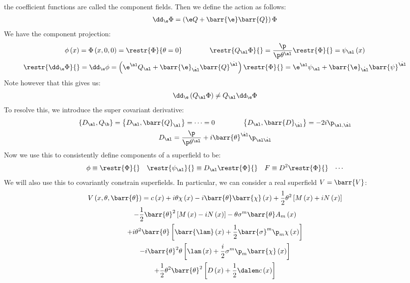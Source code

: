 \documentclass{booc}
\begin{document}
the coefficient functions are called the component fields.
Then we define the action as follows:
\begin{align}
\dd_\e \Phi = \left( \e Q + \barr{\e}\barr{Q} \right) \Phi
\end{align}
We have the component projection:
\begin{gather}
\phi\left( x \right) = \Phi\left( x , 0 , 0 \right)
= \restr{\Phi}{\theta=0}
\qquad\qquad
\restr{Q_\al \Phi}{} = 
\frac{\p}{\p\theta^\al} \restr{\Phi}{} = \psi_\al\left( x \right) \\
\restr{\dd_\e \Phi}{} = \dd_\e \phi = 
\left(\e^\al Q_\al + \barr{\e}_{\dot{\al}} \barr{Q}^{\dot{\al}}\right) \restr{\Phi}{} = 
\e^\al \psi_\al + \barr{\e}_{\dot{\al}} \barr{\psi}^{\dot{\al}}
\end{gather}
Note however that this gives us:
\begin{equation}
\dd_\e \left( Q_\al \Phi \right) \neq Q_{\al} \dd_\e \Phi
\end{equation}
To resolve this, we introduce the super covariant derivative:
\begin{gather}
\left\{ D_\al , Q_\b \right\} = \left\{ D_\al, \barr{Q}_\al \right\} = \cdots = 0 
\qquad\qquad
\left\{ D_\al , \barr{D}_{\dot{\al}} \right\} = -2i \p_{\al , \dot{\al}}
\\
D_\al = \frac{\p}{\p \theta^\al} + i \barr{\theta}^{\dot{\al}}\p_{\al \dot{\al}}
\end{gather}
Now we use this to consistently define components of a superfield to be:
\begin{align}
\phi \equiv \restr{\Phi}{} &&
\restr{\psi_\al}{} \equiv D_\al \restr{\Phi}{} &&
F \equiv D^2 \restr{\Phi}{} &&
\cdots
\end{align}
We will also use this to covariantly constrain superfields. 
In particular, we can consider a real superfield $V = \barr{V}$:
\begin{multline}
V\left( x, \theta , \barr{\theta} \right) = c\left( x \right)
+ i\theta \chi\left( x \right) - i \barr{\theta} \barr{\chi}\left( x \right)
+ \frac{1}{2} \theta^2\left[ M\left( x \right) + i N\left( x \right) \right]
\\- \frac{1}{2} \barr{\theta}^2\left[ M\left( x \right) - iN\left( x \right) \right]
- \theta\sigma^m \barr{\theta}A_m\left( x \right) 
\\+ i \theta^2 \barr{\theta}\left[ \barr{\lam} \left( x \right) 
+ \frac{1}{2} \barr{\sigma}^m \p_m \chi\left( x \right) \right]
\\- i\barr{\theta}^2 \theta \left[ \lam\left( x \right) 
+ \frac{i}{2}\sigma^m \p_m \barr{\chi}\left( x \right) \right]
\\+\frac{1}{2} \theta^2 \barr{\theta}^2 \left[ D\left( x \right) 
+ \frac{1}{2} \dalem c\left( x \right) \right]
\end{multline}
\end{document}
